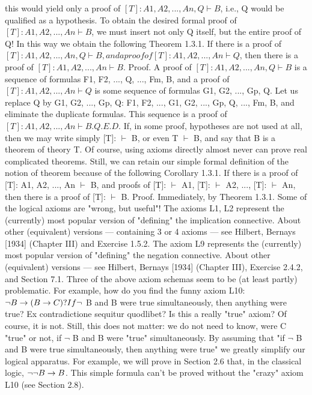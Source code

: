 this would yield only a proof of \([T]: A1, A2, ..., An, Q \vdash B\), i.e., Q would be qualified as a hypothesis. To
obtain the desired formal proof of \([T]: A1, A2, ..., An \vdash B\), we must insert not only Q itself, but the entire
proof of Q! In this way we obtain the following
Theorem 1.3.1. If there is a proof of \([T]: A1, A2, ..., An, Q \vdash B, and a proof of [T]: A1, A2, ..., An \vdash Q\),
then there is a proof of \([T]: A1, A2, ..., An \vdash B\).
Proof. A proof of \([T]: A1, A2, ..., An, Q \vdash B\) is a sequence of formulas F1, F2, ..., Q, ..., Fm, B, and a proof
of \([T]: A1, A2, ..., An \vdash Q\) is some sequence of formulas G1, G2, ..., Gp, Q. Let us replace Q by G1, G2, ...,
Gp, Q:
F1, F2, ..., G1, G2, ..., Gp, Q, ..., Fm, B,
and eliminate the duplicate formulas. This sequence is a proof of \([T]: A1, A2, ..., An \vdash B. Q.E.D.\)
If, in some proof, hypotheses are not used at all, then we may write simply [T]: \(\vdash\) B, or even T \(\vdash\) B, and
say that B is a theorem of theory T. Of course, using axioms directly almost never can prove real
complicated theorems. Still, we can retain our simple formal definition of the notion of theorem because
of the following
Corollary 1.3.1. If there is a proof of [T]: A1, A2, ..., An \(\vdash\) B, and proofs of [T]: \(\vdash\) A1, [T]: \(\vdash\) A2, ..., [T]: \(\vdash\)
An, then there is a proof of [T]: \(\vdash\) B.
Proof. Immediately, by Theorem 1.3.1.
Some of the logical axioms are "wrong, but useful"!
The axioms L1, L2 represent the (currently) most popular version of "defining" the implication
connective. About other (equivalent) versions --- containing 3 or 4 axioms --- see Hilbert, Bernays [1934]
(Chapter III) and Exercise 1.5.2.
The axiom L9 represents the (currently) most popular version of "defining" the negation connective.
About other (equivalent) versions --- see Hilbert, Bernays [1934] (Chapter III), Exercise 2.4.2, and Section
7.1.
Three of the above axiom schemas seem to be (at least partly) problematic.
For example, how do you find the funny axiom L10: \(\neg B\rightarrow (B\rightarrow C)? If \neg\) B and B were true simultaneously,
then anything were true? Ex contradictione sequitur quodlibet? Is this a really "true" axiom? Of course, it
is not. Still, this does not matter: we do not need to know, were C "true" or not, if \(\neg\) B and B were "true"
simultaneously. By assuming that "if \(\neg\) B and B were true simultaneously, then anything were true" we
greatly simplify our logical apparatus. For example, we will prove in Section 2.6 that, in the classical
logic, \(\neg \neg B\rightarrow B\). This simple formula can't be proved without the "crazy" axiom L10 (see Section 2.8).
